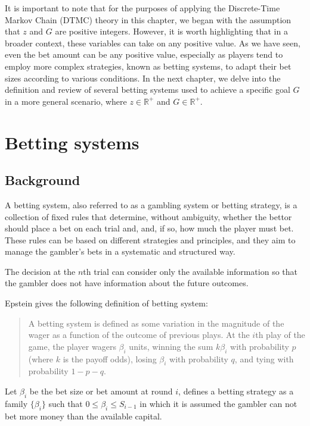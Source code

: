 \documentclass[11pt,twoside]{article}
\numberwithin{Theorem}{section}
\numberwithin{Definition}{section}
\numberwithin{Lemma}{section}
\numberwithin{Algorithm}{section}
\numberwithin{equation}{section}
\begin{document}
It is important to note that for the purposes of applying the Discrete-Time Markov Chain (DTMC) theory in this chapter, we began with the assumption that $z$ and $G$ are positive integers. However, it is worth highlighting that in a broader context, these variables can take on any positive value. As we have seen, even the bet amount can be any positive value, especially as players tend to employ more complex strategies, known as betting systems, to adapt their bet sizes according to various conditions. In the next chapter, we delve into the definition and review of several betting systems used to achieve a specific goal $G$ in a more general scenario, where $z \in \mathbb{R}^+$ and $G \in \mathbb{R}^+$.
\clearpage

\section{Betting systems} \label{Betting_systems}
\subsection{Background}
A betting system, also referred to as a gambling system or betting strategy, is a collection of fixed rules that determine, without ambiguity, whether the bettor should place a bet on each trial and, and, if so, how much the player must bet. These rules can be based on different strategies and principles, and they aim to manage the gambler's bets in a systematic and structured way.

The decision at the $n$th trial can consider only the available information so that the gambler does not have information about the future outcomes. 

 Epstein \cite[P. 55]{Epstein} gives the following definition of betting system: \begin{quote} 
{\selectfont
A betting system is defined as some variation in the magnitude of the wager as a function of the outcome of previous plays. At the $i$th play of the game, the player wagers $\beta_{i}$ units, winning the sum $k\beta_{i}$ with probability $p$ (where $k$ is the payoff odds), losing $\beta_{i}$ with probability $q$, and tying with probability $1-p-q$.}
\end{quote}

Let $\beta_{i}$ be the bet size or bet amount at round $i$, \cite{Thorp} defines a betting strategy as a family $\{\beta_{i}\}$ such that $0\leq\beta_{i}\leq S_{i-1}$ in which it is assumed the gambler can not bet more money than the available capital.
\end{document}
